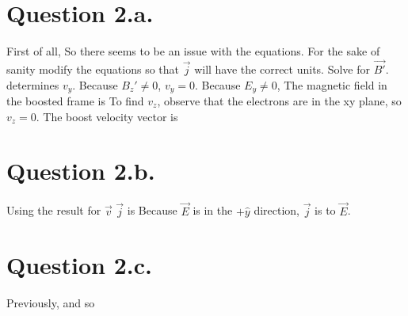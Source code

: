 \documentclass{article}
\begin{document}
\section{Question 2.a.}
First of all,
\e{[E]=[E]+[1/c][B][v]=[E]+[B]}
So there seems to be an issue with the equations. For the sake of sanity modify the equations so that $\vec{j}$ will have the correct units. Solve for $\vec{B'}$.
 determines $v_y$.
Because $B_z'\neq 0$, $v_y=0$. Because $E_y\neq 0$,
The magnetic field in the boosted frame is
To find $v_z$, observe that the electrons are in the xy plane, so $v_z=0$. The boost velocity vector is

\section{Question 2.b.}
Using the result for $\vec{v}$ $\vec{j}$ is
Because $\vec{E}$ is in the $+\hat{y}$ direction, $\vec{j}$ is  to $\vec{E}$.

\section{Question 2.c.}
Previously,
and
so
\end{document}
